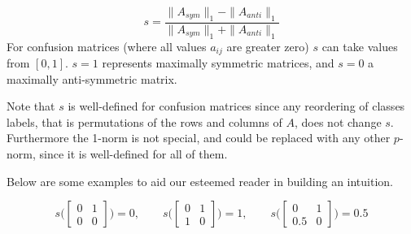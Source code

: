 \documentclass{article}
\begin{document}
\begin{equation}
	s = \frac{ \|A_{sym}\|_1 - \|A_{anti}\|_1}{\|A_{sym}\|_1 + \|A_{anti}\|_1}
\end{equation}
For confusion matrices (where all values $a_{ij}$ are greater zero) $s$ can take values from $[0,1]$. $s = 1$ represents maximally symmetric matrices, and $s = 0$ a maximally anti-symmetric matrix.

Note that $s$ is well-defined for confusion matrices since any reordering of classes labels, that is permutations of the rows and columns of $A$, does not change $s$. Furthermore the 1-norm is not special, and could be replaced with any other $p$-norm, since it is well-defined for all of them.

Below are some examples to aid our esteemed reader in building an intuition.

\begin{equation*}
	s\bigg(\begin{bmatrix}
		0 & 1 \\
		0 & 0
	\end{bmatrix}\bigg) = 0, \qquad
%
	s\bigg(\begin{bmatrix}
		0 & 1 \\
		1 & 0
	\end{bmatrix}\bigg) = 1, \qquad
%
	s\bigg( \begin{bmatrix}
		0 & 1 \\
		0.5 & 0
	\end{bmatrix}\bigg) = 0.5
\end{equation*}
%
%
\end{document}
